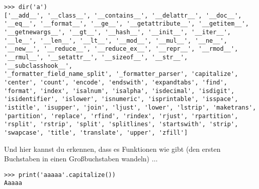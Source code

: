 \begin{Verbatim}[frame=single]
>>> dir('a')
['__add__', '__class__', '__contains__', '__delattr__', '__doc__',
'__eq__', '__format__', '__ge__', '__getattribute__', '__getitem__',
'__getnewargs__', '__gt__', '__hash__', '__init__', '__iter__',
'__le__', '__len__', '__lt__', '__mod__', '__mul__', '__ne__',
'__new__', '__reduce__', '__reduce_ex__', '__repr__', '__rmod__',
'__rmul__', '__setattr__', '__sizeof__', '__str__', '__subclasshook__',
'_formatter_field_name_split', '_formatter_parser', 'capitalize',
'center', 'count', 'encode', 'endswith', 'expandtabs', 'find',
'format', 'index', 'isalnum', 'isalpha', 'isdecimal', 'isdigit',
'isidentifier', 'islower', 'isnumeric', 'isprintable', 'isspace',
'istitle', 'isupper', 'join', 'ljust', 'lower', 'lstrip', 'maketrans',
'partition', 'replace', 'rfind', 'rindex', 'rjust', 'rpartition',
'rsplit', 'rstrip', 'split', 'splitlines', 'startswith', 'strip',
'swapcase', 'title', 'translate', 'upper', 'zfill']
\end{Verbatim}

Und hier kannst du erkennen, dass es Funktionen wie  gibt (den ersten Buchstaben in einen Großbuchstaben wandeln) $\ldots$

\begin{Verbatim}[frame=single]
>>> print('aaaaa'.capitalize())
Aaaaa
\end{Verbatim}

